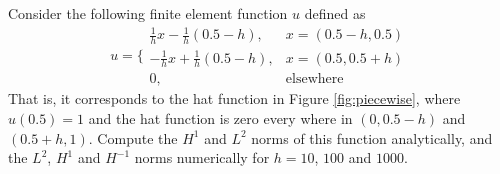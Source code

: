 \begin{exercise}
\label{ex:hat2}
Consider the following finite element function $u$ defined
as  
\[
u = \Bigg\{ 
\begin{array}{ll} \frac{1}{h} x - \frac{1}{h} (0.5 - h), & x=(0.5-h,0.5) \\  
              -\frac{1}{h} x + \frac{1}{h} (0.5 - h),  & x=(0.5,0.5 + h) \\  
                0, & \mbox{elsewhere}  
\end{array}
\]
That is, it corresponds to the hat function in Figure \ref{fig:piecewise}, where
$u(0.5)=1$ and the hat function is zero every where in $(0,0.5-h)$ and  $(0.5+h, 1)$.  
Compute the $H^1$ and $L^2$ norms of this function analytically, and the 
$L^2$, $H^1$ and $H^{-1}$ norms numerically for $h=10$, $100$ and $1000$.    
\end{exercise}






